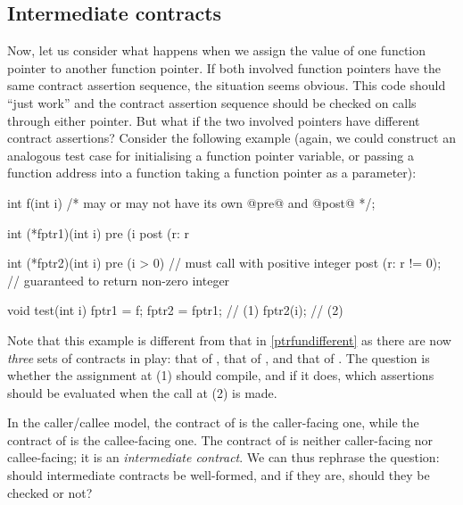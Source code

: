 \subsection{Intermediate contracts}
\label{intermediate}

Now, let us consider what happens when we assign the value of one function pointer to another function pointer. If both involved function pointers have the same contract assertion sequence, the situation seems obvious. This code should ``just work'' and the contract assertion sequence should be checked on calls through either pointer. But what if the two involved pointers have different contract assertions? Consider the following example (again, we could construct an analogous test case for initialising a function pointer variable, or passing a function address into a function taking a function pointer as a parameter):
\begin{codeblock}
int f(int i) /* may or may not have its own @pre@ and @post@ */;

int (*fptr1)(int i)
  pre (i %
  post (r: r %

int (*fptr2)(int i)
  pre (i > 0)           // must call with positive integer
  post (r: r != 0);     // guaranteed to return non-zero integer

void test(int i) {
  fptr1 = f;
  fptr2 = fptr1;  // (1)
  fptr2(i);       // (2)
}
\end{codeblock}
Note that this example is different from that in \ref{ptrfundifferent} as there are now \emph{three} sets of contracts in play: that of , that of , and that of . The question is whether the assignment at (1) should compile, and if it does, which assertions should be evaluated when the call at (2) is made. 

In the caller/callee model, the contract of  is the caller-facing one, while the contract  of  is the callee-facing one. The contract of  is neither caller-facing nor callee-facing; it is an \emph{intermediate contract}. We can thus rephrase the question: should intermediate contracts be well-formed, and if they are, should they be checked or not?

